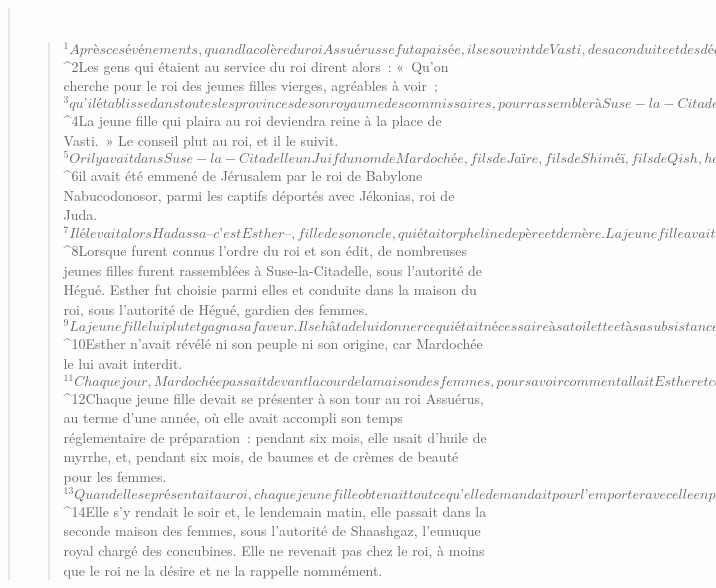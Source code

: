 \begin{verse}
         
      \bchapter{}
      \begin{verse}
${}^{1}Après ces événements, quand la colère du roi Assuérus se fut apaisée, il se souvint de Vasti, de sa conduite et des décisions prises à son sujet. 
${}^{2}Les gens qui étaient au service du roi dirent alors : « Qu’on cherche pour le roi des jeunes filles vierges, agréables à voir ; 
${}^{3}qu’il établisse dans toutes les provinces de son royaume des commissaires, pour rassembler à Suse-la-Citadelle, dans la maison des femmes, toutes les jeunes filles vierges et agréables à voir, sous l’autorité de Hégué, eunuque du roi, gardien des femmes, qui leur donnera ce qui est nécessaire à leur toilette. 
${}^{4}La jeune fille qui plaira au roi deviendra reine à la place de Vasti. » Le conseil plut au roi, et il le suivit.
${}^{5}Or il y avait dans Suse-la-Citadelle un Juif du nom de Mardochée, fils de Jaïre, fils de Shiméï, fils de Qish, homme de Benjamin ; 
${}^{6}il avait été emmené de Jérusalem par le roi de Babylone Nabucodonosor, parmi les captifs déportés avec Jékonias, roi de Juda. 
${}^{7}Il élevait alors Hadassa – c’est Esther –, fille de son oncle, qui était orpheline de père et de mère. La jeune fille avait belle prestance et elle était agréable à voir. À la mort de son père et de sa mère, Mardochée l’avait adoptée comme fille.
${}^{8}Lorsque furent connus l’ordre du roi et son édit, de nombreuses jeunes filles furent rassemblées à Suse-la-Citadelle, sous l’autorité de Hégué. Esther fut choisie parmi elles et conduite dans la maison du roi, sous l’autorité de Hégué, gardien des femmes. 
${}^{9}La jeune fille lui plut et gagna sa faveur. Il se hâta de lui donner ce qui était nécessaire à sa toilette et à sa subsistance, il lui attribua sept suivantes, venant de la maison du roi, et l’installa avec ses suivantes dans le meilleur appartement de la maison des femmes. 
${}^{10}Esther n’avait révélé ni son peuple ni son origine, car Mardochée le lui avait interdit. 
${}^{11}Chaque jour, Mardochée passait devant la cour de la maison des femmes, pour savoir comment allait Esther et comment on la traitait.
${}^{12}Chaque jeune fille devait se présenter à son tour au roi Assuérus, au terme d’une année, où elle avait accompli son temps réglementaire de préparation : pendant six mois, elle usait d’huile de myrrhe, et, pendant six mois, de baumes et de crèmes de beauté pour les femmes. 
${}^{13}Quand elle se présentait au roi, chaque jeune fille obtenait tout ce qu’elle demandait pour l’emporter avec elle en passant de la maison des femmes au palais royal. 
${}^{14}Elle s’y rendait le soir et, le lendemain matin, elle passait dans la seconde maison des femmes, sous l’autorité de Shaashgaz, l’eunuque royal chargé des concubines. Elle ne revenait pas chez le roi, à moins que le roi ne la désire et ne la rappelle nommément.

\end{verse}
\end{verse}
